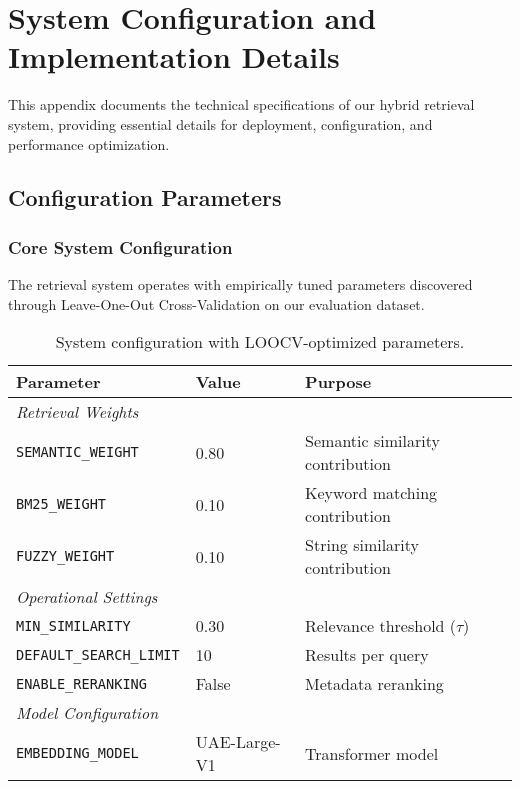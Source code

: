 \chapter{System Configuration and Implementation Details}
\label{app:implementation}

This appendix documents the technical specifications of our hybrid retrieval system, providing essential details for deployment, configuration, and performance optimization.

\section{Configuration Parameters}
\label{sec:app-config}

\subsection{Core System Configuration}

The retrieval system operates with empirically tuned parameters discovered through Leave-One-Out Cross-Validation on our evaluation dataset.

\begin{table}[!ht]
\centering
\begin{tabular}{lll}
\toprule
\textbf{Parameter} & \textbf{Value} & \textbf{Purpose} \\
\midrule
\multicolumn{3}{l}{\textit{Retrieval Weights}} \\
\texttt{SEMANTIC\_WEIGHT} & 0.80 & Semantic similarity contribution \\
\texttt{BM25\_WEIGHT} & 0.10 & Keyword matching contribution \\
\texttt{FUZZY\_WEIGHT} & 0.10 & String similarity contribution \\
\midrule
\multicolumn{3}{l}{\textit{Operational Settings}} \\
\texttt{MIN\_SIMILARITY} & 0.30 & Relevance threshold ($\tau$) \\
\texttt{DEFAULT\_SEARCH\_LIMIT} & 10 & Results per query \\
\texttt{ENABLE\_RERANKING} & False & Metadata reranking \\
\midrule
\multicolumn{3}{l}{\textit{Model Configuration}} \\
\texttt{EMBEDDING\_MODEL} & UAE-Large-V1 & Transformer model \\
\bottomrule
\end{tabular}
\caption{System configuration with LOOCV-optimized parameters.}
\label{tab:config-params}
\end{table}

